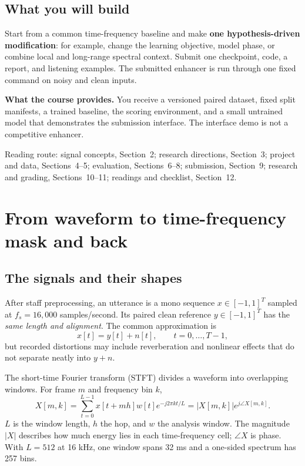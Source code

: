 \documentclass[11pt,letterpaper]{article}
\newcommand{\page}[1]{\clearpage\section{#1}}
\newcommand{\smallnote}[1]{{\small\color{graytext}#1\par}}
\begin{document}
\subsection{What you will build}
Start from a common time-frequency baseline and make \textbf{one hypothesis-driven modification}: for example, change the learning objective, model phase, or combine local and long-range spectral context. Submit one checkpoint, code, a report, and listening examples. The submitted enhancer is run through one fixed command on noisy and clean inputs.

\begin{tcolorbox}[colback=lightgray,colframe=graytext]
\textbf{What the course provides.} You receive a versioned paired dataset, fixed split manifests, a trained baseline, the scoring environment, and a small untrained model that demonstrates the submission interface. The interface demo is not a competitive enhancer.
\end{tcolorbox}
\smallnote{Reading route: signal concepts, Section~2; research directions, Section~3; project and data, Sections~4--5; evaluation, Sections~6--8; submission, Section~9; research and grading, Sections~10--11; readings and checklist, Section~12.}

\page{From waveform to time-frequency mask and back}
\subsection{The signals and their shapes}
After staff preprocessing, an utterance is a mono sequence $x\in[-1,1]^T$ sampled at $f_s=16{,}000$ samples/second. Its paired clean reference $y\in[-1,1]^T$ has the \emph{same length and alignment}. The common approximation is
\begin{equation}
x[t]=y[t]+n[t],\qquad t=0,\ldots,T-1,
\end{equation}
but recorded distortions may include reverberation and nonlinear effects that do not separate neatly into $y+n$.

The short-time Fourier transform (STFT) divides a waveform into overlapping windows. For frame $m$ and frequency bin $k$,
\begin{equation}
X[m,k]=\sum_{t=0}^{L-1}x[t+mh]w[t]e^{-j2\pi kt/L}=|X[m,k]|e^{j\angle X[m,k]}.
\end{equation}
$L$ is the window length, $h$ the hop, and $w$ the analysis window. The magnitude $|X|$ describes how much energy lies in each time-frequency cell; $\angle X$ is phase. With $L=512$ at 16 kHz, one window spans 32 ms and a one-sided spectrum has 257 bins.
\end{document}
